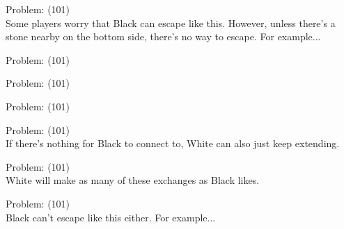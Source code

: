 \documentclass[11pt]{article}
\begin{document}
\begin{minipage}[t]{0.5\textwidth}
  {\centering
  
  Problem: (101)\\
  Some players worry that Black can escape like this. However, unless there's a stone nearby on the bottom side, there's no way to escape. For example...\\
  }
\end{minipage}
\begin{minipage}[t]{0.5\textwidth}
  {\centering
  
  Problem: (101)\\
  
  }
\end{minipage}
\begin{minipage}[t]{0.5\textwidth}
  {\centering
  
  Problem: (101)\\
  
  }
\end{minipage}
\begin{minipage}[t]{0.5\textwidth}
  {\centering
  
  Problem: (101)\\
  
  }
\end{minipage}
\begin{minipage}[t]{0.5\textwidth}
  {\centering
  
  Problem: (101)\\
  If there's nothing for Black to connect to, White can also just keep extending.\\
  }
\end{minipage}
\begin{minipage}[t]{0.5\textwidth}
  {\centering
  
  Problem: (101)\\
  White will make as many of these exchanges as Black likes.\\
  }
\end{minipage}
\begin{minipage}[t]{0.5\textwidth}
  {\centering
  
  Problem: (101)\\
  Black can't escape like this either. For example...\\
  }
\end{minipage}
\end{document}
